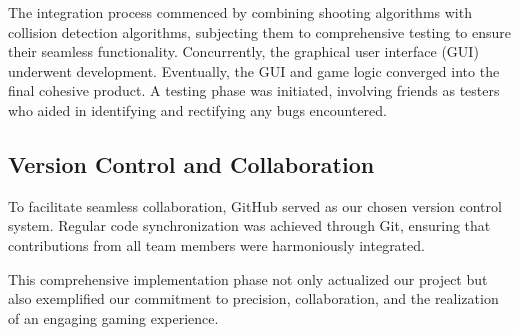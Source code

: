 	 		The integration process commenced by combining shooting algorithms with collision detection algorithms, subjecting them to comprehensive testing to ensure their seamless functionality. Concurrently, the graphical user interface (GUI) underwent development. Eventually, the GUI and game logic converged into the final cohesive product. A testing phase was initiated, involving friends as testers who aided in identifying and rectifying any bugs encountered.
	 		
	 \subsection{ Version Control and Collaboration}
	 
	 		To facilitate seamless collaboration, GitHub served as our chosen version control system. Regular code synchronization was achieved through Git, ensuring that contributions from all team members were harmoniously integrated.
	 		


This comprehensive implementation phase not only actualized our project but also exemplified our commitment to precision, collaboration, and the realization of an engaging gaming experience.



\newpage